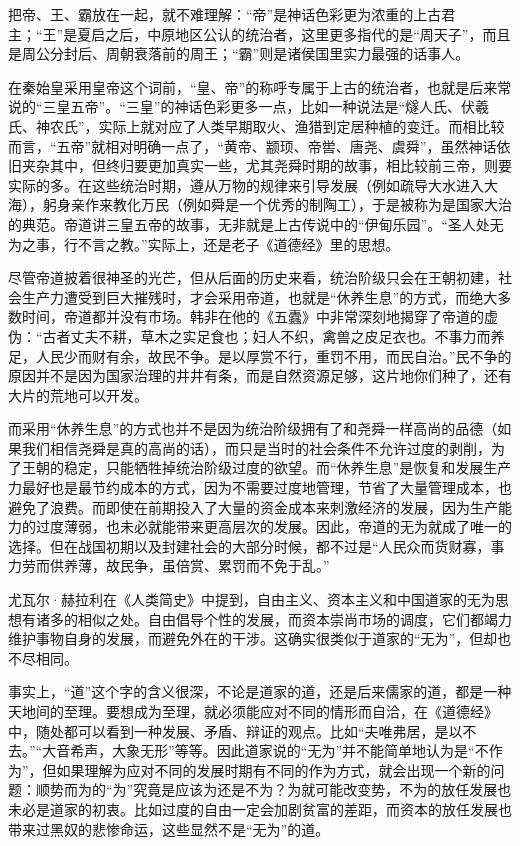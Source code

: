 \documentclass[]{book}
\begin{document}
把帝、王、霸放在一起，就不难理解：``帝''是神话色彩更为浓重的上古君主；``王''是夏启之后，中原地区公认的统治者，这里更多指代的是``周天子''，而且是周公分封后、周朝衰落前的周王；``霸''则是诸侯国里实力最强的话事人。

在秦始皇采用皇帝这个词前，``皇、帝''的称呼专属于上古的统治者，也就是后来常说的``三皇五帝''。``三皇''的神话色彩更多一点，比如一种说法是``燧人氏、伏羲氏、神农氏''，实际上就对应了人类早期取火、渔猎到定居种植的变迁。而相比较而言，``五帝''就相对明确一点了，``黄帝、颛顼、帝喾、唐尧、虞舜''，虽然神话依旧夹杂其中，但终归要更加真实一些，尤其尧舜时期的故事，相比较前三帝，则要实际的多。在这些统治时期，遵从万物的规律来引导发展（例如疏导大水进入大海），躬身亲作来教化万民（例如舜是一个优秀的制陶工），于是被称为是国家大治的典范。帝道讲三皇五帝的故事，无非就是上古传说中的``伊甸乐园''。``圣人处无为之事，行不言之教。''实际上，还是老子《道德经》里的思想。

尽管帝道披着很神圣的光芒，但从后面的历史来看，统治阶级只会在王朝初建，社会生产力遭受到巨大摧残时，才会采用帝道，也就是``休养生息''的方式，而绝大多数时间，帝道都并没有市场。韩非在他的《五蠹》中非常深刻地揭穿了帝道的虚伪：``古者丈夫不耕，草木之实足食也；妇人不织，禽兽之皮足衣也。不事力而养足，人民少而财有余，故民不争。是以厚赏不行，重罚不用，而民自治。''民不争的原因并不是因为国家治理的井井有条，而是自然资源足够，这片地你们种了，还有大片的荒地可以开发。

而采用``休养生息''的方式也并不是因为统治阶级拥有了和尧舜一样高尚的品德（如果我们相信尧舜是真的高尚的话），而只是当时的社会条件不允许过度的剥削，为了王朝的稳定，只能牺牲掉统治阶级过度的欲望。而``休养生息''是恢复和发展生产力最好也是最节约成本的方式，因为不需要过度地管理，节省了大量管理成本，也避免了浪费。而即使在前期投入了大量的资金成本来刺激经济的发展，因为生产能力的过度薄弱，也未必就能带来更高层次的发展。因此，帝道的无为就成了唯一的选择。但在战国初期以及封建社会的大部分时候，都不过是``人民众而货财寡，事力劳而供养薄，故民争，虽倍赏、累罚而不免于乱。''

尤瓦尔·赫拉利在《人类简史》中提到，自由主义、资本主义和中国道家的无为思想有诸多的相似之处。自由倡导个性的发展，而资本崇尚市场的调度，它们都竭力维护事物自身的发展，而避免外在的干涉。这确实很类似于道家的``无为''，但却也不尽相同。

事实上，``道''这个字的含义很深，不论是道家的道，还是后来儒家的道，都是一种天地间的至理。要想成为至理，就必须能应对不同的情形而自洽，在《道德经》中，随处都可以看到一种发展、矛盾、辩证的观点。比如``夫唯弗居，是以不去。''``大音希声，大象无形''等等。因此道家说的``无为''并不能简单地认为是``不作为''，但如果理解为应对不同的发展时期有不同的作为方式，就会出现一个新的问题：顺势而为的``为''究竟是应该为还是不为？为就可能改变势，不为的放任发展也未必是道家的初衷。比如过度的自由一定会加剧贫富的差距，而资本的放任发展也带来过黑奴的悲惨命运，这些显然不是``无为''的道。
\end{document}
